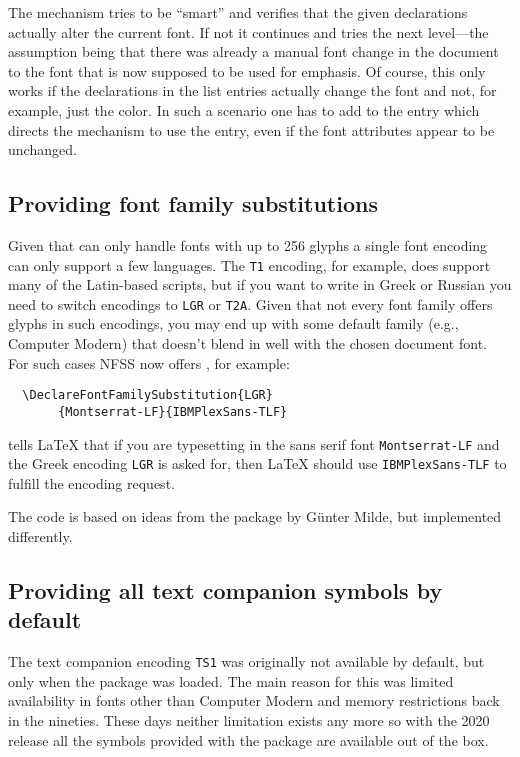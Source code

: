 \documentclass{ltnews}
\providecommand\pdfTeX{\hologo{pdfTeX}}
\begin{document}
The mechanism tries to be \enquote{smart} and verifies that the given
declarations actually alter the current font. If not it continues and
tries the next level---the assumption being that there was already a
manual font change in the document to the font that is now supposed to
be used for emphasis.
%
Of course, this only works if the declarations in the list entries
actually change the font and not, for example, just the color. In such
a scenario one has to add  to the entry which directs the
mechanism to use the entry, even if the font attributes appear to be
unchanged.



\subsection{Providing font family substitutions}

Given that \pdfTeX{} can only handle fonts with up to 256 glyphs a
single font encoding can only support a few languages. The \texttt{T1}
encoding, for example, does support many of the Latin-based scripts,
but if you want to write in Greek or Russian you need to switch
encodings to \texttt{LGR} or \texttt{T2A}. Given that not every font
family offers glyphs in such encodings, you may end up with some
default family (e.g., Computer Modern) that doesn’t blend in well
with the chosen document font.  For such cases NFSS now offers
, for example:
\begin{verbatim}
  \DeclareFontFamilySubstitution{LGR}
       {Montserrat-LF}{IBMPlexSans-TLF}
\end{verbatim}
tells \LaTeX{} that if you are typesetting in the sans serif font
\texttt{Montserrat-LF} and the Greek encoding \texttt{LGR} is asked
for, then \LaTeX{} should use \texttt{IBMPlexSans-TLF} to fulfill the
encoding request.

The code is based on ideas from the 
package by Günter Milde, but implemented differently.


\subsection{Providing all text companion symbols by default}

The text companion encoding \texttt{TS1} was originally not available
by default, but only when the  package was loaded. The
main reason for this was limited availability in fonts other than
Computer Modern and memory restrictions back in the nineties. These
days neither limitation exists any more so with the 2020 release all
the symbols provided with the  package are available out
of the box.
\end{document}
